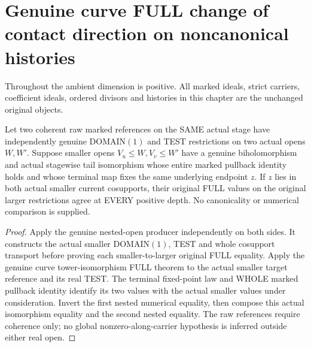 \section{Genuine curve FULL change of contact direction on noncanonical histories}

Throughout the ambient dimension is positive. All marked ideals, strict
carriers, coefficient ideals, ordered divisors and histories in this chapter
are the unchanged original objects.

\begin{theorem}
\label{hir:original-curve-full-local-tail-isomorphism}
\leanok
Let two coherent raw marked references on the SAME actual stage have
independently genuine DOMAIN$(1)$ and TEST restrictions on two actual
opens $W,W'$. Suppose smaller opens $V_u\le W,V_v\le W'$ have a genuine
biholomorphism and actual stagewise tail isomorphism whose entire marked
pullback identity holds and whose terminal map fixes the same underlying
endpoint $z$. If $z$ lies in both actual smaller current cosupports, their
original FULL values on the original larger restrictions agree at EVERY
positive depth. No canonicality or numerical comparison is supplied.
\end{theorem}
\begin{proof}
Apply the genuine nested-open producer independently on both sides. It
constructs the actual smaller DOMAIN$(1)$, TEST and whole cosupport
transport before proving each smaller-to-larger original FULL equality.
Apply the genuine curve tower-isomorphism FULL theorem to the actual
smaller target reference and its real TEST. The terminal fixed-point law
and WHOLE marked pullback identity identify its two values with the actual
smaller values under consideration. Invert the first nested numerical
equality, then compose this actual isomorphism equality and the second
nested equality. The raw references require coherence only; no global
nonzero-along-carrier hypothesis is inferred outside either real open.
\end{proof}

